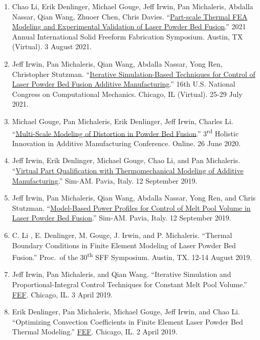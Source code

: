 \documentclass[10.5pt,letterpaper]{article}
\begin{document}
\begin{enumerate}[leftmargin=*]
	\setlength{\parskip}{0em}
	\item Chao Li, Erik Denlinger, Michael Gouge, Jeff Irwin, Pan Michaleris, Abdalla Nassar, Qian Wang, Zhuoer Chen, Chris Davies. ``\href{https://d29ef8db-6eea-4fe5-b986-5259d5da02f5.filesusr.com/ugd/eade24_1b9eafda54ef4f67b8a6ab53b2e3451a.pdf}{Part-scale Thermal FEA Modeling and Experimental Validation of Laser 
Powder Bed Fusion}.''  2021 Annual International Solid Freeform Fabrication Symposium. Austin, TX (Virtual).  3 August 2021.
	\item Jeff Irwin, Pan Michaleris, Qian Wang, Abdalla Nassar, Yong Ren, Christopher Stutzman. ``\href{https://player.vimeo.com/video/581569814}{Iterative Simulation-Based Techniques for Control of Laser Powder Bed Fusion Additive Manufacturing}.'' 16th U.S. National Congress on Computational Mechanics. Chicago, IL (Virtual).  25-29 July 2021.
	\item Michael Gouge, Pan Michaleris, Erik Denlinger, Jeff Irwin, Charles Li. ``\href{https://nserc-hi-am.ca/2020/conference-program/}{Multi-Scale Modeling of Distortion in Powder Bed Fusion}.'' 3\textsuperscript{rd} Holistic Innovation in Additive Manufacturing Conference. Online.  26 June 2020.
	\item Jeff Irwin, Erik Denlinger, Michael Gouge, Chao Li, and Pan Michaleris.  ``\href{http://congress.cimne.com/sim-am2019/frontal/Doc/IndustrialWorkshops/Autodesk.pdf}{Virtual Part Qualification with Thermomechanical Modeling of Additive Manufacturing}.'' Sim-AM.  Pavia, Italy.  12 September 2019.
	\item Jeff Irwin, Pan Michaleris, Qian Wang,  Abdalla  Nassar, Yong Ren, and Chris Stutzman.  ``\href{http://congress.cimne.com/sim-am2019/admin/files/fileabstract/a464.pdf}{Model-Based Power Profiles for Control of Melt Pool Volume in Laser Powder Bed Fusion}.'' Sim-AM.  Pavia, Italy.  12 September 2019.
	\item C. Li , E. Denlinger, M. Gouge, J. Irwin, and P. Michaleris. ``Thermal Boundary Conditions in Finite Element Modeling of Laser Powder Bed Fusion.'' Proc.\ of the 30\textsuperscript{th} SFF Symposium. Austin, TX.  12-14 August 2019.
	\item Jeff Irwin, Pan Michaleris, and Qian Wang.  ``Iterative Simulation and Proportional-Integral Control Techniques for Constant Melt Pool Volume.''  \href{http://www.fef2019.org/}{FEF}\@.  Chicago, IL.  3 April 2019.
	\item Erik Denlinger, Pan Michaleris, Michael Gouge, Jeff Irwin, and Chao Li.  ``Optimizing Convection Coefficients in Finite Element Laser Powder Bed Thermal Modeling.''  \href{http://www.fef2019.org/}{FEF}\@.  Chicago, IL.  2 April 2019.

\end{enumerate}
\end{document}
